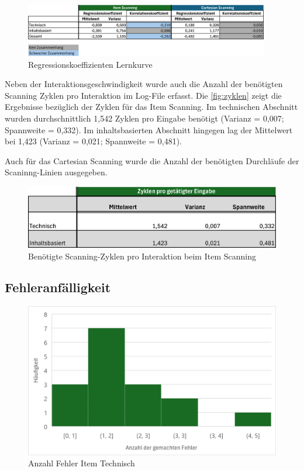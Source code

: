 \begin{figure}[tbh]
    \centering
    \includegraphics[width=0.95\textwidth]{images/Results/Regressionskoeffizienten-Korrelation-Table-Lernkurve-Geschwindigkeit.png}
    \caption{Regressionskoeffizienten Lernkurve}
    \label{fig:RegressionskoeffizientenTable}
\end{figure}

Neben der Interaktionsgeschwindigkeit wurde auch die Anzahl der benötigten Scanning Zyklen pro Interaktion im Log-File erfasst. Die \autoref{fig:zyklen} zeigt die Ergebnisse bezüglich der Zyklen für das Item Scanning. Im technischen Abschnitt wurden durchschnittlich 1,542 Zyklen pro Eingabe benötigt (Varianz = 0,007; Spannweite = 0,332). Im inhaltsbasierten Abschnitt hingegen lag der Mittelwert bei 1,423 (Varianz = 0,021; Spannweite = 0,481).

Auch für das Cartesian Scanning wurde die Anzahl der benötigten Durchläufe der Scaninng-Linien ausgegeben. %

\begin{figure}[tbh]
    \centering
   \includegraphics{images/Results/Zyklen-Item.png}
    \caption{Benötigte Scanning-Zyklen pro Interaktion beim Item Scanning}
    \label{fig:zyklen}
   \end{figure}


\subsection{Fehleranfälligkeit}

\begin{figure}[tbh]
 \centering
\includegraphics{images/Results/Histogramm-Anzahl-Fehler-technisch-item.png}
 \caption{Anzahl Fehler Item Technisch}
 \label{fig:anzahlFehlerItemTechnisch}
\end{figure}


